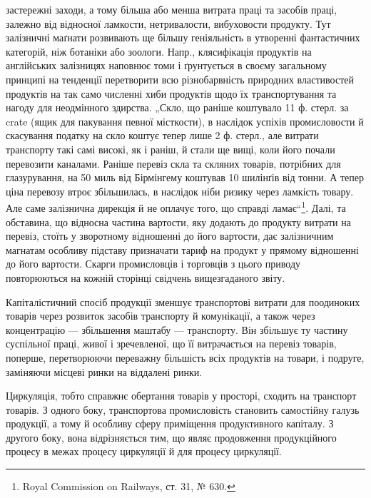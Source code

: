застережні заходи, а тому більша або менша витрата праці та засобів
праці, залежно від відносної ламкости, нетривалости, вибуховости продукту.
Тут залізничні маґнати розвивають ще більшу геніяльність в утворенні
фантастичних категорій, ніж ботаніки або зоологи. Напр., клясифікація
продуктів на англійських залізницях наповнює томи і ґрунтується
в своєму загальному принципі на тенденції перетворити всю різнобарвність
природних властивостей продуктів на так само численні хиби продуктів
щодо їх транспортування та нагоду для неодмінного здирства.
„Скло, що раніше коштувало 11 ф. стерл. за crate (ящик для пакування
певної місткости), в наслідок успіхів промисловости й скасування податку
на скло коштує тепер лише 2 ф. стерл., але витрати транспорту такі самі
високі, як і раніш, й стали ще вищі, коли його почали перевозити каналами.
Раніше перевіз скла та скляних товарів, потрібних для глазурування,
на 50 миль від Бірмінгему коштував 10 шилінґів від тонни. А
тепер ціна перевозу втроє збільшилась, в наслідок ніби ризику через
ламкість товару. Але саме залізнична дирекція й не оплачує того, що
справді ламає“\footnote{
Royal Commission on Railways, ст. 31, № 630.
}. Далі, та обставина, що відносна частина вартости, яку
додають до продукту витрати на перевіз, стоїть у зворотному відношенні
до його вартости, дає залізничним магнатам особливу підставу призначати
тариф на продукт у прямому відношенні до його вартости. Скарги промисловців
і торговців з цього приводу повторюються на кожній сторінці
свідчень вищезгаданого звіту.

Капіталістичний спосіб продукції зменшує транспортові витрати для
поодиноких товарів через розвиток засобів транспорту й комунікації, а
також через концентрацію — збільшення маштабу — транспорту. Він збільшує
ту частину суспільної праці, живої і зречевленої, що її витрачається
на перевіз товарів, поперше, перетворюючи переважну більшість всіх
продуктів на товари, і подруге, заміняючи місцеві ринки на віддалені
ринки.

Циркуляція, тобто справжнє обертання товарів у просторі, сходить на
транспорт товарів. З одного боку, транспортова промисловість становить
самостійну галузь продукції, а тому й особливу сферу приміщення продуктивного
капіталу. З другого боку, вона відрізняється тим, що являє
продовження продукційного процесу в межах процесу циркуляції й
для процесу циркуляції.